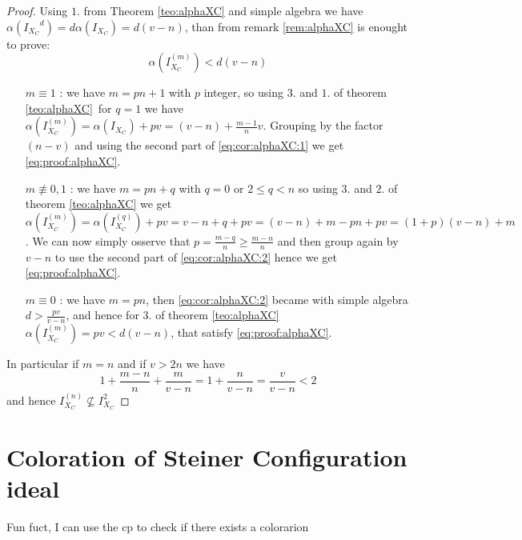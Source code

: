 \documentclass[]{book}
\theoremstyle{plain}
\theoremstyle{remark}
\theoremstyle{definition}
\DeclareMathOperator*{\eqb }{=}
\begin{document}
 \begin{proof}
 Using $ 1. $ from Theorem \ref{teo:alphaXC} and simple algebra we have $ \alpha({I_{X_C}}^d) = d\alpha(I_{X_C}) = d(v- n) $, than from remark \ref{rem:alphaXC} is enought to prove:
 \begin{equation}\label{eq:proof:alphaXC}
 \alpha(I_{X_C}^{(m)}) < d(v-n)
 \end{equation}
 \begin{itemize}
 \item[$m \equiv 1$ : ] we have $ m = pn + 1 $ with $ p $ integer, so using $ 3. $ and $ 1. $ of theorem \ref{teo:alphaXC} for $ q = 1 $ we have $  \alpha(I_{X_C}^{(m)}) \eqb \alpha(I_{X_C} ) + pv \eqb (v-n) + \frac{m-1}{n}v  $. Grouping by the factor $ (n-v) $ and using the second part of \ref{eq:cor:alphaXC:1} we get \ref{eq:proof:alphaXC}. 
 \item[$m \not\equiv 0,1$ : ] we have $ m = pn + q $ with $ q = 0 $ or $ 2 \leq q < n $ so using $ 3. $ and $ 2. $ of theorem \ref{teo:alphaXC} we get  $  \alpha(I_{X_C}^{(m)}) \eqb \alpha(I_{X_C}^{(q)} ) + pv \eqb v - n + q  +pv = (v - n) + m -pn +pv = (1 + p)(v - n) + m $. We can now simply osserve that $ p = \frac{m-q}{n} \geq \frac{m-n}{n} $ and then group again by $ v-n $ to use the second part of \ref{eq:cor:alphaXC:2} hence we get \ref{eq:proof:alphaXC}.
 \item[$ m\equiv 0 $ : ] we have $ m=pn $, then \ref{eq:cor:alphaXC:2} became with simple algebra $ d > \frac{pv}{v-n} $, and hence for $ 3. $ of theorem \ref{teo:alphaXC} $  \alpha(I_{X_C}^{(m)})= pv < d(v-n)$, that satisfy \ref{eq:proof:alphaXC}. 
 \end{itemize}
 In particular if $ m=n $ and if $ v > 2n $ we have 
 \[ 1 +\frac{ m - n }{ n } + \frac{ m }{ v - n } = 1 + \frac{ n }{ v - n }= \frac{ v }{ v - n } <2 \]
 and hence $ I_{X_C}^{(n)} \not \subseteq I_{X_C}^2  $
 
 \end{proof}
 

\chapter{Coloration of Steiner Configuration ideal}
Fun fuct, I can use the cp to check if there exists a colorarion


\backmatter
\printbibliography
\end{document}

